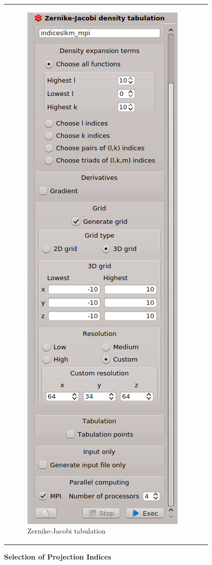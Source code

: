 \documentclass[10pt]{article}
\begin{document}
\begin{tabular}{lr}
\begin{minipage}{.5\linewidth}
\begin{figure}[H]
\begin{center}
\includegraphics[width=.5\linewidth]{damqt_fig_2_14_1.png}
\end{center}
\vspace*{0cm}
\caption{{Zernike-Jacobi tabulation}\label{fig:2_14_1}}
\end{figure}
\end{minipage}
\end{tabular}
\vspace*{1cm}


{\bf Selection of Projection Indices}
\vspace*{3mm}
\end{document}
